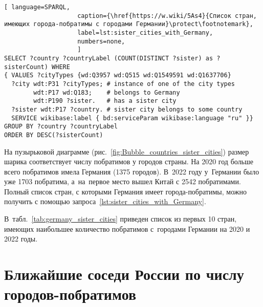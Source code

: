 \begin{lstlisting}[ language=SPARQL, 
                    caption={\href{https://w.wiki/5As4}{Список стран, имеющих города-побратимы с городами Германии}\protect\footnotemark},
                    label=lst:sister_cities_with_Germany,
                    numbers=none,
                    ]
SELECT ?country ?countryLabel (COUNT(DISTINCT ?sister) as ?sisterCount) WHERE
{ VALUES ?cityTypes {wd:Q3957 wd:Q515 wd:Q1549591 wd:Q1637706}
  ?city wdt:P31 ?cityTypes; # instance of one of the city types
        wdt:P17 wd:Q183;    # belongs to Germany
        wdt:P190 ?sister.   # has a sister city
  ?sister wdt:P17 ?country. # sister city belongs to some country
  SERVICE wikibase:label { bd:serviceParam wikibase:language "ru" }}
GROUP BY ?country ?countryLabel
ORDER BY DESC(?sisterCount)\end{lstlisting}%


На пузырьковой диаграмме (рис.~\ref{fig:Bubble_countries_sister_cities}) 
размер шарика соответствует числу побратимов у городов страны. 
На 2020 год больше всего побратимов имела Германия (\num{1375} городов). 
В~2022 году у~Германии было уже 1703 побратима, 
а~на~первое место вышел Китай с 2542 побратимами. 
Полный список стран, с которыми Германия имеет города-побратимы, 
можно получить с помощью запроса~\ref{lst:sister_cities_with_Germany}.

В~табл.~\ref{tab:germany_sister_cities} приведен список из первых 10 стран, 
имеющих наибольшее количество побратимов с~городами Германии на 2020 и 2022 годы. 




\section{Ближайшие соседи России по числу городов-побратимов}

